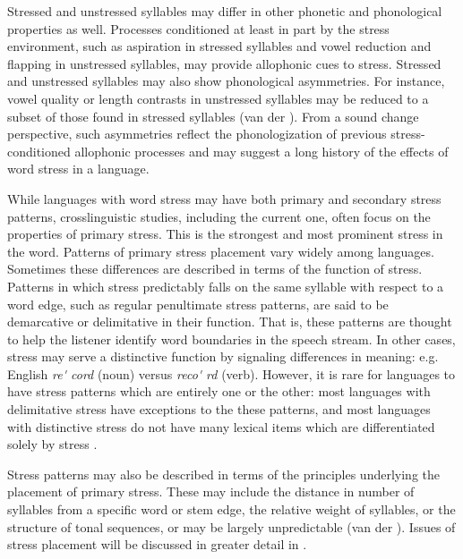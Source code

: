   Stressed and unstressed syllables may differ in other phonetic and phonological properties as well. Processes conditioned at least in part by the stress environment, such as aspiration in stressed syllables and vowel reduction and flapping in unstressed syllables, may provide allophonic cues to stress. Stressed and unstressed syllables may also show phonological asymmetries. For instance, vowel quality or length contrasts in unstressed syllables may be reduced to a subset of those found in stressed syllables (van der \citealt{Hulst2010}). From a sound change perspective, such asymmetries reflect the phonologization of previous stress-conditioned allophonic processes and may suggest a long history of the effects of word stress in a language.

  While languages with word stress may have both primary and secondary stress patterns, crosslinguistic studies, including the current one, often focus on the properties of primary stress. This is the strongest and most prominent stress in the word. Patterns of primary stress placement vary widely among languages. Sometimes these differences are described in terms of the function of stress. Patterns in which stress predictably falls on the same syllable with respect to a word edge, such as regular penultimate stress patterns, are said to be demarcative or delimitative in their function. That is, these patterns are thought to help the listener identify word boundaries in the speech stream. In other cases, stress may serve a distinctive function by signaling differences in meaning: e.g. English \textit{re\'{} cord} (noun) versus \textit{reco\'{} rd} (verb). However, it is rare for languages to have stress patterns which are entirely one or the other: most languages with delimitative stress have exceptions to the these patterns, and most languages with distinctive stress do not have many lexical items which are differentiated solely by stress \citep[14-15]{Cruttenden1997}. 

  Stress patterns may also be described in terms of the principles underlying the placement of primary stress. These may include the distance in number of syllables from a specific word or stem edge, the relative weight of syllables, or the structure of tonal sequences, or may be largely unpredictable (van der \citealt{Hulst2010}). Issues of stress placement will be discussed in greater detail in .

